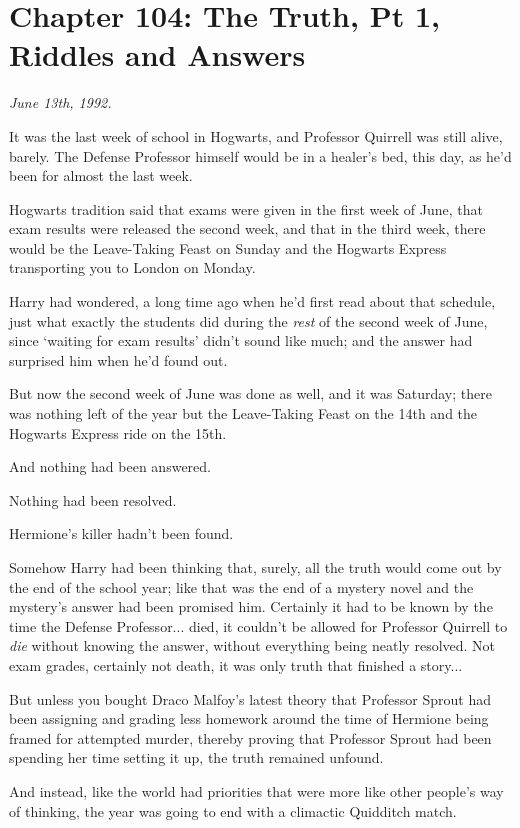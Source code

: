\chapter{Chapter 104: The Truth, Pt 1, Riddles and Answers}
\emph{June 13th, 1992.}

It was the last week of school in Hogwarts, and Professor Quirrell was still alive, barely. The Defense Professor himself would be in a healer's bed, this day, as he'd been for almost the last week.

Hogwarts tradition said that exams were given in the first week of June, that exam results were released the second week, and that in the third week, there would be the Leave-Taking Feast on Sunday and the Hogwarts Express transporting you to London on Monday.

Harry had wondered, a long time ago when he'd first read about that schedule, just what exactly the students did during the \emph{rest} of the second week of June, since `waiting for exam results' didn't sound like much; and the answer had surprised him when he'd found out.

But now the second week of June was done as well, and it was Saturday; there was nothing left of the year but the Leave-Taking Feast on the 14th and the Hogwarts Express ride on the 15th.

And nothing had been answered.

Nothing had been resolved.

Hermione's killer hadn't been found.

Somehow Harry had been thinking that, surely, all the truth would come out by the end of the school year; like that was the end of a mystery novel and the mystery's answer had been promised him. Certainly it had to be known by the time the Defense Professor... died, it couldn't be allowed for Professor Quirrell to \emph{die} without knowing the answer, without everything being neatly resolved. Not exam grades, certainly not death, it was only truth that finished a story...

But unless you bought Draco Malfoy's latest theory that Professor Sprout had been assigning and grading less homework around the time of Hermione being framed for attempted murder, thereby proving that Professor Sprout had been spending her time setting it up, the truth remained unfound.

And instead, like the world had priorities that were more like other people's way of thinking, the year was going to end with a climactic Quidditch match.

